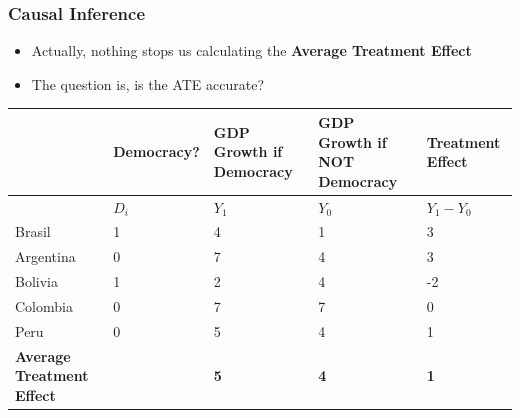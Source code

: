 \documentclass[xcolor=x11names,compress]{beamer}\usepackage[]{graphicx}\usepackage[]{color}
\renewcommand{\(}{\begin{columns}}
\renewcommand{\)}{\end{columns}}
\newcommand{\<}[1]{\begin{column}{#1}}
\renewcommand{\>}{\end{column}}
\begin{document}
\begin{frame}
\frametitle{Causal Inference}
\begin{itemize}
\item Actually, nothing stops us calculating the \textbf{Average Treatment Effect}
\pause
\item The question is, is the ATE accurate?
\pause
\end{itemize}
\footnotesize
\begin{table}[htbp]
  \centering
    \begin{tabular}{|p{1.8cm}|p{1.8cm}|p{2cm}|p{2cm}|p{2cm}|}
    \hline
          & \multicolumn{1}{p{1.8cm}|}{Democracy?} & \multicolumn{1}{p{2cm}|}{GDP Growth if Democracy} & \multicolumn{1}{p{2.2cm}|}{GDP Growth if NOT Democracy} & \textbf{Treatment Effect} \bigstrut\\
    \hline
          & \multicolumn{1}{p{1.8cm}|}{$D_i$} & \multicolumn{1}{p{2cm}|}{$Y_1$} & \multicolumn{1}{p{2.2cm}|}{$Y_0$} & \multicolumn{1}{p{1.8cm}|}{$Y_{1} - Y_{0}$} \bigstrut\\
    \hline
    Brasil & 1 & 4     & 1      & 3 \bigstrut\\
    \hline
    Argentina & 0 & 7    & 4      & 3 \bigstrut\\
    \hline
    Bolivia & 1 & 2     & 4     & -2 \bigstrut\\
    \hline
    Colombia & 0 &  7   & 7    & 0 \bigstrut\\
    \hline
    Peru & 0 & 5     & 4     & 1 \bigstrut\\
    \hline
    \textbf{Average Treatment Effect} & & \textbf{5} & \textbf{4} & \textbf{1} \bigstrut\\
    \hline
    \end{tabular}%
  \label{tab:addlabel}%
\end{table}%
\normalsize
\end{frame}
\end{document}

